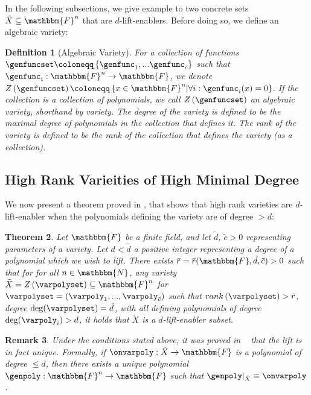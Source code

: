 \documentclass[10pt,a4paper]{article}
\newtheorem{theorem}{Theorem}[section]
\newtheorem{definition}[theorem]{Definition}
\newtheorem{remark}[theorem]{Remark}
\newcommand{\definedas}[0]{\coloneqq}
\newcommand{\parens}[1]{\left( #1 \right)}
\newcommand{\set}[1]{\left\{ #1 \right\}}
\newcommand{\suchthat}[0]{\middle|}
\newcommand{\basefield}[0]{\mathbbm{F}}
\newcommand{\blocklength}[0]{n}
\newcommand{\field}[0]{\basefield^{\blocklength}}
\newcommand{\degree}[0]{d}
\newcommand{\funcdef}[3]{#1:#2\rightarrow#3}
\newcommand{\restrictfunc}[2]{#1|_{#2}}
\newcommand{\naturalnumbersset}[0]{\mathbbm{N}}
\newcommand{\variety}{{\tilde{X}}}
\newcommand{\varietypolycount}{{\tilde{c}}}
\newcommand{\varietydeg}[0]{\tilde{\degree}}
\newcommand{\zerofunc}[1]{Z \parens{#1}}
\newcommand{\rank}[1]{rank \parens{#1}}
\newcommand{\varietyrankval}[0]{{\bar{r}}}
\begin{document}
In the following subsections, we give example to two concrete sets $\variety \subseteq \field$ that are $\degree$-lift-enablers.
Before doing so, we define an algebraic variety:
\begin{definition}[Algebraic Variety]
    For a collection of functions $\genfuncset \definedas \set{\genfunc_1,...\genfunc_c}$ such that $\funcdef{\genfunc_i}{\field}{\basefield}$,
    we denote $\zerofunc{\genfuncset} \definedas \set{x \in \field \suchthat \forall i: \genfunc_i(x) = 0}$.
    \newline
    If the collection is a collection of polynomials, we call $\zerofunc{\genfuncset}$ an \emph{algebraic variety}, shorthand by \emph{variety}.
    \newline
    The degree of the variety is defined to be the maximal degree of polynomials in the collection that defines it.
    The rank of the variety is defined to be the rank of the collection that defines the variety (as a collection).
\end{definition}

\subsection[High Rank Varieties of High Minimal Degree]{High Rank Varieities of High Minimal Degree}\label{subsec:high-rank-varieities-of-high-degree}
We now present a theorem proved in \cite[Corollary 1.10]{kazhdan2018polynomial}, that shows that high rank varieties are $\degree$-lift-enabler when the polynomials defining the variety are of degree $>\degree$:
\begin{theorem}\label{subsec:high-rank-varities-are-d-lift-enabler}
    Let $\basefield$ be a finite field, and let $\varietydeg$, $\varietypolycount>0$ representing parameters of a variety.
    Let $\degree < \varietydeg$ a positive integer representing a degree of a polynomial which we wish to lift.
    There exists $\varietyrankval=\varietyrankval(\basefield,\varietydeg,\varietypolycount)>0$ such that for for all $\blocklength \in \naturalnumbersset$, any variety $\variety = \zerofunc{\varpolyset} \subseteq \field$ for $\varpolyset = (\varpoly_1,...,\varpoly_{\varietypolycount})$
    such that $\rank{\varpolyset} > \varietyrankval$, degree $\deg(\varpolyset) = \varietydeg$, with all defining polynomials of degree $\deg(\varpoly_i)> \degree$,
    it holds that $\variety$ is a $\degree$-lift-enabler subset.
\end{theorem}
\begin{remark}
    Under the conditions stated above, it was proved in ~\cite{kazhdan2018polynomial} that the lift is in fact \emph{unique}.
    Formally, if $\funcdef{\onvarpoly}{\variety}{\basefield}$ is a polynomial of degree $\leq \degree$,
    then there exists a \emph{unique} polynomial $\funcdef{\genpoly }{\field}{\basefield}$ such that $\restrictfunc{\genpoly}{\variety} \equiv \onvarpoly$.
\end{remark}
\end{document}
